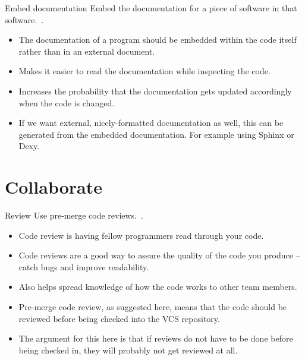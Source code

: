 \documentclass[english]{beamer}
\newcommand{\sectionslide}{\centering\vspace*{25mm}%
  {\bfseries\LARGE \insertsection}}
\begin{document}

\begin{frame}{\insertsection}{Embed documentation}
  Embed the documentation for a piece of software in that
  software.~\cite{Wilson2013}.
  \begin{itemize}
  \item The documentation of a program should be embedded within the
    code itself rather than in an external document.
  \item Makes it easier to read the documentation while inspecting the
    code.
  \item Increases the probability that the documentation gets updated
    accordingly when the code is changed.
  \item If we want external, nicely-formatted documentation as well,
    this can be generated from the embedded documentation. For example
    using Sphinx or Dexy.
  \end{itemize}
\end{frame}


\section{Collaborate}

\begin{frame}
  \sectionslide
\end{frame}


\begin{frame}{\insertsection}{Review}
  Use pre-merge code reviews.~\cite{Wilson2013}.
  \begin{itemize}
  \item Code review is having fellow programmers read through your
    code.
  \item Code reviews are a good way to assure the quality of the code
    you produce -- catch bugs and improve readability.
  \item Also helps spread knowledge of how the code works to other
    team members.
  \item Pre-merge code review, as suggested here, means that the code
    should be reviewed before being checked into the VCS repository.
  \item The argument for this here is that if reviews do not have to
    be done before being checked in, they will probably not get
    reviewed at all.
  \end{itemize}
\end{frame}
\end{document}
